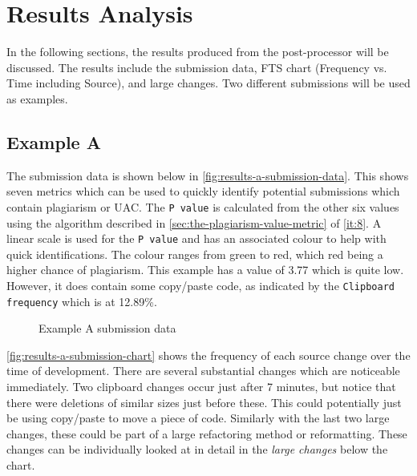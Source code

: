 \chapter{Results Analysis}
\label{chp:results}
In the following sections, the results produced from the post-processor will be discussed. The results include the submission data, FTS chart (Frequency vs. Time including Source), and large changes. Two different submissions will be used as examples.

\section{Example A}
The submission data is shown below in \autoref{fig:results-a-submission-data}. This shows seven metrics which can be used to quickly identify potential submissions which contain plagiarism or UAC. The \texttt{P value} is calculated from the other six values using the algorithm described in \autoref{sec:the-plagiarism-value-metric} of \autoref{it:8}. A linear scale is used for the \texttt{P value} and has an associated colour to help with quick identifications. The colour ranges from green to red, which red being a higher chance of plagiarism. This example has a value of 3.77 which is quite low. However, it does contain some copy/paste code, as indicated by the \texttt{Clipboard frequency} which is at 12.89\%.

\begin{figure}[H]
  \centering
  \caption[Submission Results A Data]{Example A submission data}
  \label{fig:results-a-submission-data}
\end{figure}

\newpage

\autoref{fig:results-a-submission-chart} shows the frequency of each source change over the time of development. There are several substantial changes which are noticeable immediately. Two clipboard changes occur just after 7 minutes, but notice that there were deletions of similar sizes just before these. This could potentially just be using copy/paste to move a piece of code. Similarly with the last two large changes, these could be part of a large refactoring method or reformatting. These changes can be individually looked at in detail in the \textit{large changes} below the chart.

